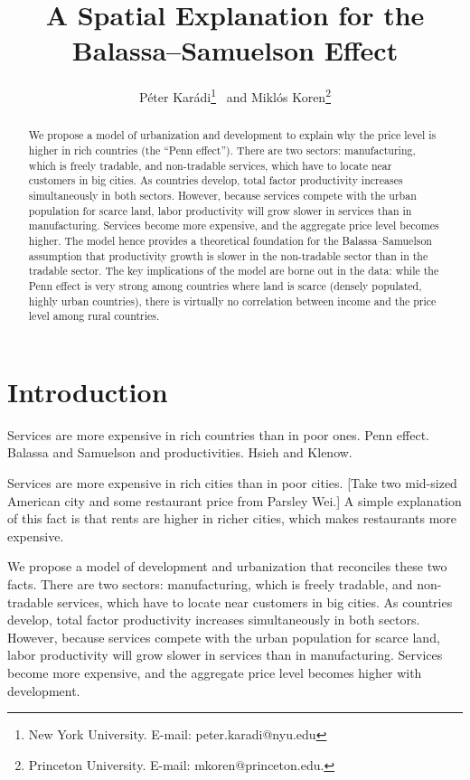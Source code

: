 \documentclass[12pt]{article}
\begin{document}
\title{A Spatial Explanation for the Balassa--Samuelson Effect}
\author{P\'eter Kar\'adi\thanks{New York University. E-mail: peter.karadi@nyu.edu}~ and Mikl\'os Koren\thanks{Princeton University. E-mail: mkoren@princeton.edu.}}
\maketitle

\begin{abstract}
We propose a model of urbanization and development to explain why the price level is higher in rich countries (the ``Penn effect''). There are two sectors: manufacturing, which is freely tradable, and non-tradable services, which have to locate near customers in big cities. As countries develop, total factor productivity increases simultaneously in both sectors. However, because services compete with the urban population for scarce land, labor productivity will grow slower in services than in manufacturing. Services become more expensive, and the aggregate price level becomes higher. The model hence provides a theoretical foundation for the Balassa--Samuelson assumption that productivity growth is slower in the non-tradable sector than in the tradable sector. The key implications of the model are borne out in the data: while the Penn effect is very strong among countries where land is scarce (densely populated, highly urban countries), there is virtually no correlation between income and the price level among rural countries.
\end{abstract}

\section{Introduction}
Services are more expensive in rich countries than in poor ones. Penn effect. Balassa and Samuelson and productivities. Hsieh and Klenow.

Services are more expensive in rich cities than in poor cities. [Take two mid-sized American city and some restaurant price from Parsley Wei.] A simple explanation of this fact is that rents are higher in richer cities, which makes restaurants more expensive.

We propose a model of development and urbanization that reconciles these two facts. There are two sectors: manufacturing, which is freely tradable, and non-tradable services, which have to locate near customers in big cities. As countries develop, total factor productivity increases simultaneously in both sectors. However, because services compete with the urban population for scarce land, labor productivity will grow slower in services than in manufacturing. Services become more expensive, and the aggregate price level becomes higher with development.
\end{document}
